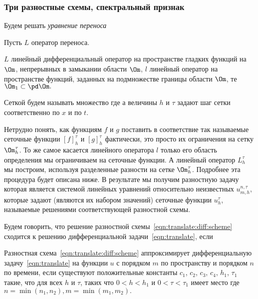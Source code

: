 \documentclass[a4paper]{article}
\begin{document}
\subsubsection{Три разностные схемы, спектральный признак}

Будем решать \emph{уравнение переноса} 

Пусть $L$ оператор переноса.

$L$ линейный дифференциальный оператор на пространстве гладких функций
на $\Om$, непрерывных в замыкании области $\Om$, $l$ линейный оператор
на пространстве функций, заданных на подмножестве границы области
$\Om$, те $\Om_1\subset\pd\Om.$

\begin{df}
Сеткой будем называть множество  где  а величины $h$ и $\tau$ задают шаг сетки
соответственно по $x$ и по $t$.
\end{df}
Нетрудно понять, как функциям $f$ и $g$ поставить в соответствие так
называемые сеточные функции $[f]_h^{\tau}$ и $[g]_h^{\tau}$
фактически, это просто их ограничения на сетку $\Om_h^{\tau}$. То же
самое касается линейного оператора $l$ только его область определения
мы ограничиваем на сеточные функции. А линейный оператор $L_h^{\tau}$
мы построим, используя разделенные разности на сетке
$\Om_h^{\tau}$. Подробнее эта процедура будет описана ниже. В
результате мы получим разностную задачу
 которая является системой линейных уравнений относительно
неизвестных $u_{m,h}^{n,\tau}$, которые задают (являются их набором
значений) сеточные функции $u_h^{\tau}$, называемые решениями
соответствующей разностной схемы.
\begin{df}
Будем говорить, что решение разностной
схемы~\eqref{eqn:translate:diff:scheme} сходится к решению
дифференциальной задачи~\eqref{eqn:translate}, если
\end{df}
\begin{df}
Разностная схема~\eqref{eqn:translate:diff:scheme} аппроксимирует
дифференциальную задачу~\eqref{eqn:translate} на функции $u$ с
порядком $m$ по пространству и порядком $n$ по времени, если
существуют положительные константы $c_1$, $c_2$, $c_3$, $c_4$, $h_1$,
$\tau_1$ такие, что для всех $h$ и $\tau$, таких что $0<h<h_1$ и
$0<\tau<\tau_1$ имеет место  где $n=\min(n_1, n_2), m=\min(m_1, m_2).$
\end{df}
\end{document}
